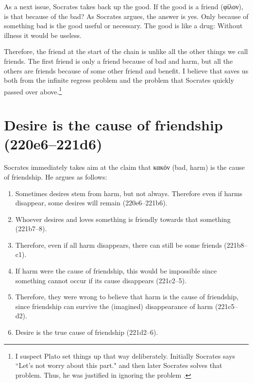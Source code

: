 \documentclass[11pt]{article}
\begin{document}
As a next issue, Socrates takes back up the good.  If the good is a friend ({\g φίλον}), is that because of the bad?  As Socrates argues, the answer is yes.  Only because of something bad is the good useful or necessary.  The good is like a drug: Without illness it would be useless.

Therefore, the friend at the start of the chain is unlike all the other things we call friends.  The first friend is only a friend because of bad and harm, but all the others are friends because of some other friend and benefit.  I believe that saves us both from the infinite regress problem and the problem that Socrates quickly passed over above.\footnote{I suspect Plato set things up that way deliberately.  Initially Socrates says ``Let's not worry about this part." and then later Socrates solves that problem.  Thus, he was justified in ignoring the problem .}


\section{Desire is the cause of friendship (220e6--221d6)}

Socrates immediately takes aim at the claim that {\g κακόν} (bad, harm) is the cause of friendship.  He argues as follows:

\begin{enumerate}
    \item Sometimes desires stem from harm, but not always.  Therefore even if harms disappear, some desires will remain (220e6--221b6).
    \item Whoever desires and loves something is friendly towards that something (221b7--8).
    \item Therefore, even if all harm disappears, there can still be some friends (221b8--c1).
    \item If harm were the cause of friendship, this would be impossible since something cannot occur if its cause disappears (221c2--5).
    \item Therefore, they were wrong to believe that harm is the cause of friendship, since friendship can survive the (imagined) disappearance of harm (221c5--d2).
    \item Desire is the true cause of friendship (221d2--6).
\end{enumerate}
\end{document}
